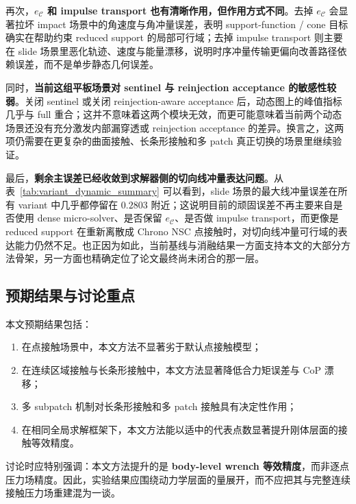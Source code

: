 再次，\textbf{$e_{\mathcal{C}}$ 和 impulse transport 也有清晰作用，但作用方式不同}。去掉 $e_{\mathcal{C}}$ 会显著拉坏 impact 场景中的角速度与角冲量误差，表明 support-function / cone 目标确实在帮助约束 reduced support 的局部可行域；去掉 impulse transport 则主要在 slide 场景里恶化轨迹、速度与能量漂移，说明时序冲量传输更偏向改善路径依赖误差，而不是单步静态几何误差。

同时，\textbf{当前这组平板场景对 sentinel 与 reinjection acceptance 的敏感性较弱}。关闭 sentinel 或关闭 reinjection-aware acceptance 后，动态图上的峰值指标几乎与 full 重合；这并不意味着这两个模块无效，而更可能意味着当前两个动态场景还没有充分激发内部漏穿透或 reinjection acceptance 的差异。换言之，这两项仍需要在更复杂的曲面接触、长条形接触和多 patch 真正切换的场景里继续验证。

最后，\textbf{剩余主误差已经收敛到求解器侧的切向线冲量表达问题}。从表~\ref{tab:variant_dynamic_summary} 可以看到，slide 场景的最大线冲量误差在所有 variant 中几乎都停留在 $0.2803$ 附近；这说明目前的顽固误差不再主要来自是否使用 dense micro-solver、是否保留 $e_{\mathcal{C}}$、是否做 impulse transport，而更像是 reduced support 在重新离散成 Chrono NSC 点接触时，对切向线冲量可行域的表达能力仍然不足。也正因为如此，当前基线与消融结果一方面支持本文的大部分方法骨架，另一方面也精确定位了论文最终尚未闭合的那一层。

\subsection{预期结果与讨论重点}

本文预期结果包括：
\begin{enumerate}[label=(\arabic*)]
    \item 在点接触场景中，本文方法不显著劣于默认点接触模型；
    \item 在连续区域接触与长条形接触中，本文方法显著降低合力矩误差与 CoP 漂移；
    \item 多 subpatch 机制对长条形接触和多 patch 接触具有决定性作用；
    \item 在相同全局求解框架下，本文方法能以适中的代表点数显著提升刚体层面的接触等效精度。
\end{enumerate}

讨论时应特别强调：本文方法提升的是 \textbf{body-level wrench 等效精度}，而非逐点压力场精度。因此，实验结果应围绕动力学层面的量展开，而不应把其与完整连续接触压力场重建混为一谈。
